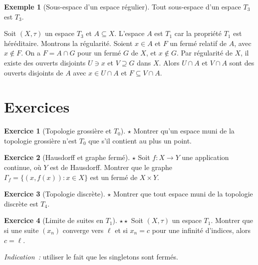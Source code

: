 \documentclass[12pt,a4paper,openany]{book}
\theoremstyle{definition}
\theoremstyle{cours}
\theoremstyle{coursnormal}
\newtheorem{exemple}[theoreme]{Exemple}
\newtheorem{exercice}{Exercice}[chapter]
\begin{document}
\begin{exemple}[Sous-espace d'un espace régulier]\label{ex:sous-espace-regulier}
  Tout sous-espace d'un espace $T_3$ est $T_3$.

  Soit $(X,\tau)$ un espace $T_3$ et $A\subseteq X$. L'espace $A$ est $T_1$
  car la propriété $T_1$ est héréditaire. Montrons la régularité. Soient
  $x\in A$ et $F$ un fermé relatif de $A$, avec $x\notin F$. On a
  $F=A\cap G$ pour un fermé $G$ de $X$, et $x\notin G$. Par régularité de
  $X$, il existe des ouverts disjoints $U\ni x$ et $V\supseteq G$ dans $X$.
  Alors $U\cap A$ et $V\cap A$ sont des ouverts disjoints de $A$ avec
  $x\in U\cap A$ et $F\subseteq V\cap A$.
\end{exemple}

\section{Exercices}\label{sec:exo-separation}

\begin{exercice}[Topologie grossière et $T_0$]\label{exo:exo:grossiere-T0}%
  {\normalfont\textbf{$\star$}}
  Montrer qu'un espace muni de la topologie grossière n'est $T_0$ que s'il
  contient au plus un point.
\end{exercice}

\begin{exercice}[Hausdorff et graphe fermé]\label{exo:exo:hausdorff-graphe}%
  {\normalfont\textbf{$\star$}}
  Soit $f\colon X\to Y$ une application continue, où $Y$ est de Hausdorff.
  Montrer que le graphe $\Gamma_f=\{(x,f(x)):x\in X\}$ est un fermé de
  $X\times Y$.
\end{exercice}

\begin{exercice}[Topologie discrète]\label{exo:exo:discrete-T4}%
  {\normalfont\textbf{$\star$}}
  Montrer que tout espace muni de la topologie discrète est $T_4$.
\end{exercice}

\begin{exercice}[Limite de suites en $T_1$]\label{exo:exo:limite-T1}%
  {\normalfont\textbf{$\star\star$}}
  Soit $(X,\tau)$ un espace $T_1$. Montrer que si une suite $(x_n)$ converge
  vers $\ell$ et si $x_n=c$ pour une infinité d'indices, alors $c=\ell$.

  \emph{Indication~:} utiliser le fait que les singletons sont fermés.
\end{exercice}
\end{document}
